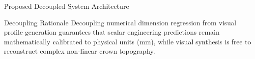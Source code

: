 \documentclass[aspectratio=169]{beamer}
\begin{document}
\begin{frame}{Proposed Decoupled System Architecture}
\begin{center}
	\end{center}
	\begin{block}{Decoupling Rationale}
		Decoupling numerical dimension regression from visual profile generation guarantees that scalar engineering predictions remain mathematically calibrated to physical units (mm), while visual synthesis is free to reconstruct complex non-linear crown topography.
	\end{block}
\end{frame}

\end{document}
